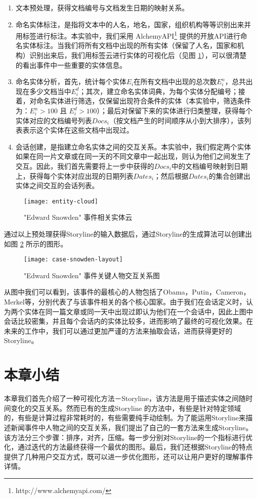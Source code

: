 \begin{enumerate}[(1)]
\item 文本预处理，获得文档编号与文档发生日期的映射关系。
\item 命名实体标注，是指将文本中的人名，地名，国家，组织机构等等识别出来并用标签进行标注。本实验中，我们采用 AlchemyAPI\footnote{http://www.alchemyapi.com/} 提供的开放API进行命名实体标注。当我们将所有文档中出现的所有实体（保留了人名，国家和机构）识别出来后，我们用标签云进行实体的可视化后（见图 \ref{fig:entity-cloud}），可以很清楚的看出事件中一些重要的实体信息。
\item 命名实体分析，首先，统计每个实体$E_i$在所有文档中出现的总次数$E_i^n$，总共出现在多少文档当中$E_i^d$；其次，建立命名实体词典，为每个实体分配编号；接着，对命名实体进行筛选，仅保留出现符合条件的实体（本实验中，筛选条件为：$E_i^n > 100$ 且 $E_i^d > 100$）；最后对保留下来的实体进行归类整理，获得每个实体对应的文档编号列表$Docs_i$（按文档产生的时间顺序从小到大排序），该列表表示这个实体在这些文档中出现过。
\item 会话创建，是指建立命名实体之间的交互关系。本实验中，我们假定两个实体如果在同一片文章或在同一天的不同文章中一起出现，则认为他们之间发生了交互。因此，我们首先需要将上一步中获得的$Docs_i$中的文档编号映射到日期上，获得每个实体对应出现的日期列表$Dates_i$；然后根据$Dates_i$的集合创建出实体之间交互的会话列表。
\end{enumerate}
\begin{figure}[htb]
    \centering
        \texttt{[image: entity-cloud]}
    \caption{"Edward Snowden" 事件相关实体云}
    \label{fig:entity-cloud}
\end{figure}

通过以上预处理获得Storyline的输入数据后，通过Storyline的生成算法可以创建出如图 \ref{fig:case-snowden-layout} 所示的图形。
\begin{figure}[htb]
    \centering
        \texttt{[image: case-snowden-layout]}
    \caption{"Edward Snowden" 事件关键人物交互关系图}
    \label{fig:case-snowden-layout}
\end{figure}
从图中我们可以看到，该事件的最核心的人物包括了Obama，Putin，Cameron，Merkel等，分别代表了与该事件相关的各个核心国家。由于我们在会话定义时，认为两个实体在同一篇文章或同一天中出现过即认为他们在一个会话中，因此上图中会话比较密集，并且每个会话内的实体比较多，进而影响了最终的可视化效果。在未来的工作中，我们可以通过更加严谨的方法来抽取会话，进而获得更好的Storyline。
\section{本章小结}
本章我们首先介绍了一种可视化方法－Storyline，该方法是用于描述实体之间随时间变化的交互关系。然而已有的生成Storyline 的方法中，有些是针对特定领域的，有些是计算过程非常耗时的，有些需要纯手动绘制。为了能运用Storyline来描述新闻事件中人物之间的交互关系，我们提出了自己的一套方法来生成Storyline。该方法分三个步骤：排序，对齐，压缩。每一步分别对Storyline的一个指标进行优化，通过迭代的方法最终获得一个最优的图形。最后，我们还根据Storyline的特点提供了几种用户交互方式，既可以进一步优化图形，还可以让用户更好的理解事件详情。
